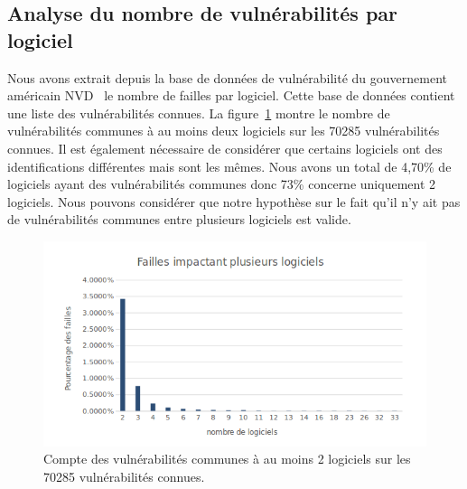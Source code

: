 \subsection{Analyse du nombre de vulnérabilités par logiciel}
Nous avons extrait depuis la base de données de vulnérabilité du gouvernement américain NVD~\cite{vulnDatabase} le nombre de failles par logiciel.
Cette base de données contient une liste des vulnérabilités connues.
La figure~\ref{fig:vulPerLog} montre le nombre de vulnérabilités communes à au moins deux logiciels sur les 70285 vulnérabilités connues.
Il est également nécessaire de considérer que certains logiciels ont des identifications différentes mais sont les mêmes.
Nous avons un total de 4,70\% de logiciels ayant des vulnérabilités communes donc 73\% concerne uniquement 2 logiciels.
Nous pouvons considérer que notre hypothèse sur le fait qu'il n'y ait pas de vulnérabilités communes entre plusieurs logiciels est valide.

\begin{figure}
\includegraphics[width=\linewidth]{data/commonVuln.png}
\caption{Compte des vulnérabilités communes à au moins 2 logiciels sur les 70285 vulnérabilités connues.}
\label{fig:vulPerLog}
\end{figure}

